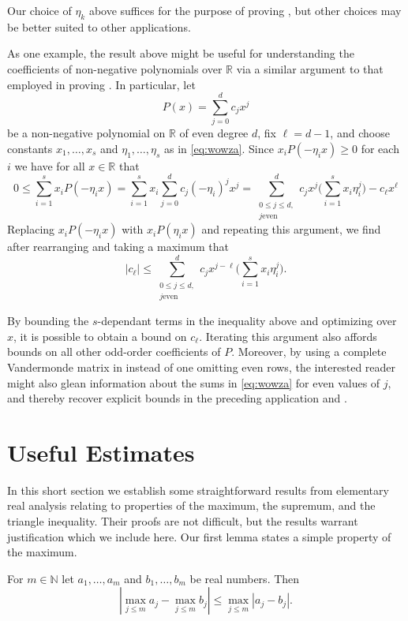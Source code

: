 \documentclass[oneside,hidelinks,indentfirst,10pt]{book}
\begin{document}
Our choice of \(\eta_k\) above suffices for the purpose of proving , but other choices may be better suited to other applications.


As one example, the result above might be useful for understanding the coefficients of non-negative polynomials over \(\mathbb{R}\) via a similar argument to that employed in proving . In particular, let
\[
    P(x)=\sum_{j=0}^dc_jx^j
\]
be a non-negative polynomial on \(\mathbb{R}\) of even degree \(d\), fix \(\ell=d-1\), and choose constants \(x_1,\dots,x_s\) and \(\eta_1,\dots,\eta_s\) as in \eqref{eq:wowza}. Since \(x_iP(-\eta_ix)\geq 0\) for each \(i\) we have for all \(x\in\mathbb{R}\) that
\[
    0\leq \sum_{i=1}^sx_iP(-\eta_ix)=\sum_{i=1}^sx_i\sum_{j=0}^dc_j(-\eta_i)^jx^j=\sum_{\substack{0\leq j\leq d,\\j\textrm{even}}}^dc_jx^j\bigg(\sum_{i=1}^sx_i\eta_i^j\bigg)-c_\ell x^\ell
\]
Replacing \(x_iP(-\eta_ix)\) with \(x_iP(\eta_ix)\) and repeating this argument, we find after rearranging and taking a maximum that
\[
    |c_\ell|\leq \sum_{\substack{0\leq j\leq d,\\j\textrm{even}}}^dc_jx^{j-\ell}\bigg(\sum_{i=1}^sx_i\eta_i^j\bigg).
\]


By bounding the \(s\)-dependant terms in the inequality above and optimizing over \(x\), it is possible to obtain a bound on \(c_\ell\). Iterating this argument also affords bounds on all other odd-order coefficients of \(P\). Moreover, by using a complete Vandermonde matrix in  instead of one omitting even rows, the interested reader might also glean information about the sums in \eqref{eq:wowza} for even values of \(j\), and thereby recover explicit bounds in the preceding application and .


\section{Useful Estimates}


In this short section we establish some straightforward results from elementary real analysis relating to properties of the maximum, the supremum, and the triangle inequality. Their proofs are not difficult, but the results warrant justification which we include here. Our first lemma states a simple property of the maximum.


\begin{lem}\label{lem:maxproplem}
For \(m\in\mathbb{N}\) let \(a_1,\dots,a_m\) and \(b_1,\dots,b_m\) be real numbers. Then
\begin{equation}\label{eq:maxprop}
    |\max_{j\leq m}a_j-\max_{j\leq m}b_j|\leq \max_{j\leq m}|a_j-b_j|.
\end{equation}
\end{lem}
\end{document}
